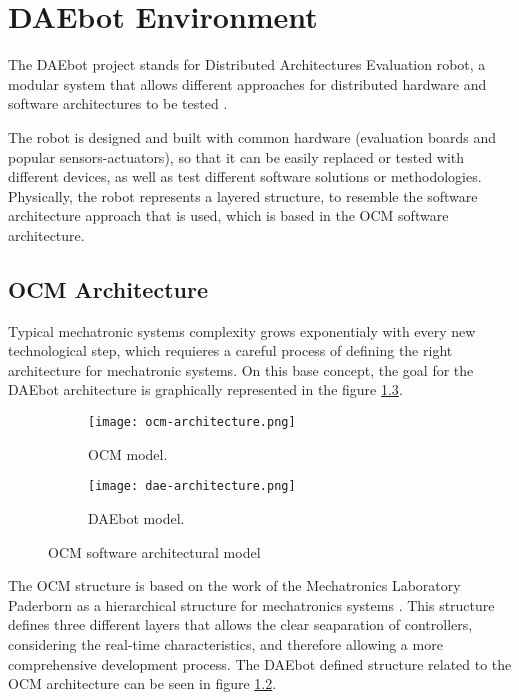 

\chapter{DAEbot Environment}

The DAEbot project stands for Distributed Architectures Evaluation robot, a modular system that allows different approaches for distributed hardware and software architectures to be tested \cite{Wiki}.

The robot is designed and built with common hardware (evaluation boards and popular sensors-actuators), so that it can be easily replaced or tested with different devices, as well as test different software solutions or methodologies. Physically, the robot represents a layered structure, to resemble the software architecture approach that is used, which is based in the OCM software architecture.

\section{OCM Architecture}

Typical mechatronic systems complexity grows exponentialy with every new technological step, which requieres a careful process of defining the right architecture for mechatronic systems. On this base concept, the goal for the DAEbot architecture is graphically represented in the figure \ref{fig:ocm-dae}.

\begin{figure}[htp]
	\centering
	\begin{subfigure}{0.5\textwidth}
		\centering
		\texttt{[image: ocm-architecture.png]}
		\caption{OCM model.} \label{fig:ocm-architecture}
	\end{subfigure}%
	\begin{subfigure}{0.5\textwidth}
		\centering
		\texttt{[image: dae-architecture.png]}
		\caption{DAEbot model.} \label{fig:dae-architecture}
	\end{subfigure}%
	\caption{OCM software architectural model} \label{fig:ocm-dae}
\end{figure}%

The OCM structure is based on the work of the Mechatronics Laboratory Paderborn as a hierarchical structure for mechatronics systems \cite{Lueckel2001}. This structure defines three different layers that allows the clear seaparation of controllers, considering the real-time characteristics, and therefore allowing a more comprehensive development process. The DAEbot defined structure related to the OCM architecture can be seen in figure \ref{fig:dae-architecture}.

